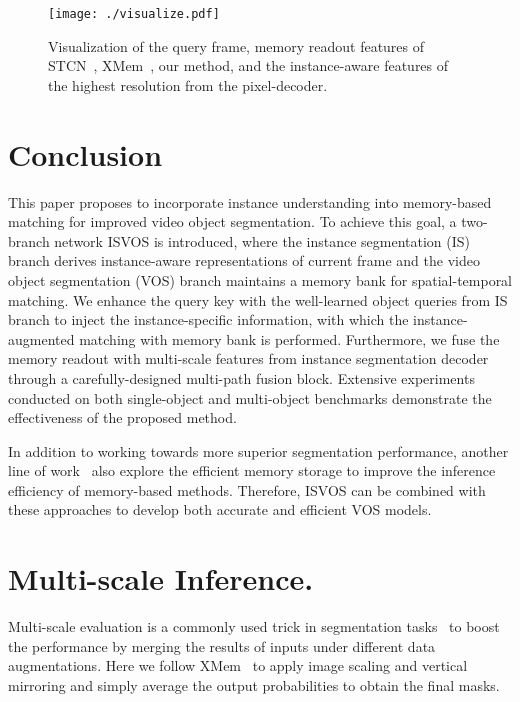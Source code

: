\documentclass[10pt,twocolumn,letterpaper]{article}
\newcommand{\system}{ISVOS\xspace}
\begin{document}
\begin{figure}[!ht]
  \centering
   \texttt{[image: ./visualize.pdf]}
   \vspace{-0.15in}
   \caption{Visualization of the query frame, memory readout features of STCN~\cite{cheng2021stcn}, XMem~\cite{cheng2022xmem}, our method, and the instance-aware features of the highest resolution  from the pixel-decoder.}
   \label{fig:visualization}
\end{figure}

\section{Conclusion}
\label{sec:conclusion}
This paper proposes to incorporate instance understanding into memory-based matching for improved video object segmentation. To achieve this goal, a two-branch network \system is introduced, where the instance segmentation (IS) branch derives instance-aware representations of current frame and the video object segmentation (VOS) branch maintains a memory bank for spatial-temporal matching. We enhance the query key with the well-learned object queries from IS branch to inject the instance-specific information, with which the instance-augmented matching with memory bank is performed. Furthermore, we fuse the memory readout with multi-scale features from instance segmentation decoder through a carefully-designed multi-path fusion block. Extensive experiments conducted on both single-object and multi-object benchmarks demonstrate the effectiveness of the proposed method.

In addition to working towards more superior segmentation performance, another line of work~\cite{liang2020video,xie2021efficient,xu2022accelerating} also explore the efficient memory storage to improve the inference efficiency of memory-based methods. Therefore, \system can be combined with these approaches to develop both accurate and efficient VOS models.

{\small


}
\appendix
\section{Multi-scale Inference.}
Multi-scale evaluation is a commonly used trick in segmentation tasks~\cite{chandra2016fast,cheng2021stcn,cheng2022xmem} to boost the performance by merging the results of inputs under different data augmentations. Here we follow XMem~\cite{cheng2022xmem} to apply image scaling and vertical mirroring and simply
average the output probabilities to obtain the final masks. 
\end{document}
